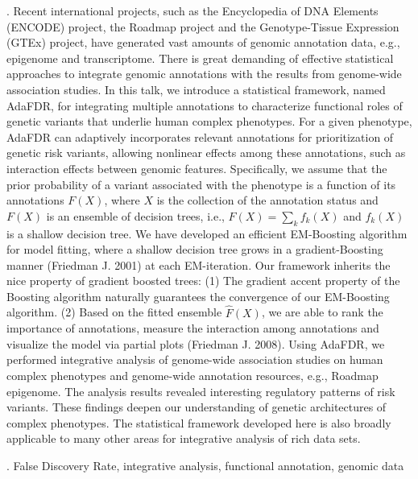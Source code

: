 \documentclass[12pt]{article}
\begin{document}
. Recent international projects, such as the Encyclopedia of DNA Elements (ENCODE) project, the Roadmap project and the Genotype-Tissue Expression (GTEx) project, have generated vast amounts of genomic annotation data, e.g., epigenome and transcriptome. There is great demanding of effective statistical approaches to integrate genomic annotations with the results from genome-wide association studies. In this talk, we introduce a statistical framework, named AdaFDR, for integrating multiple annotations to characterize functional roles of genetic variants that underlie human complex phenotypes. For a given phenotype, AdaFDR can adaptively incorporates relevant annotations for prioritization of genetic risk variants, allowing nonlinear effects among these annotations, such as interaction effects between genomic features. Specifically, we assume that the prior probability of a variant associated with the phenotype is a function of its annotations $F(X)$, where $X$ is the collection of the annotation status and $F(X)$ is an ensemble of decision trees, i.e., $F(X) = \sum_k f_k(X)$ and $f_k(X)$ is a shallow decision tree. We have developed an efficient EM-Boosting algorithm for model fitting, where a shallow decision tree grows in a gradient-Boosting manner (Friedman J. 2001) at each EM-iteration. Our framework inherits the nice property of gradient boosted trees: (1) The gradient accent property of the Boosting algorithm naturally guarantees the convergence of our EM-Boosting algorithm. (2) Based on the fitted ensemble $\hat{F}(X)$, we are able to rank the importance of annotations, measure the interaction among annotations and visualize the model via partial plots (Friedman J. 2008). Using AdaFDR, we performed integrative analysis of genome-wide association studies on human complex phenotypes and genome-wide annotation resources, e.g., Roadmap epigenome. The analysis results revealed interesting regulatory patterns of risk variants. These findings deepen our understanding of genetic architectures of complex phenotypes. The statistical framework developed here is also broadly applicable to many other areas for integrative analysis of rich data sets.

\vskip 2mm

.
False Discovery Rate, integrative analysis, functional annotation, genomic data
\end{document}
